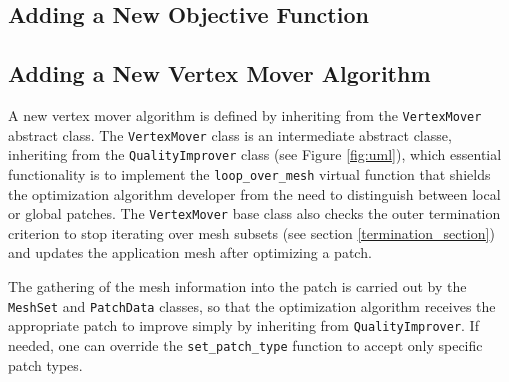 \subsection{Adding a New Objective Function}

\subsection{Adding a New Vertex Mover Algorithm}

A new vertex mover algorithm is defined by inheriting from the
\texttt{VertexMover} abstract class. The \texttt{VertexMover} class 
is an intermediate abstract classe, inheriting from the
\texttt{QualityImprover} class (see Figure \ref{fig:uml}),  which
essential functionality is to implement the \texttt{loop\_over\_mesh}
virtual function that shields the optimization algorithm developer
from the need to distinguish between local or global patches.  The
\texttt{VertexMover} base class also checks the outer termination
criterion to stop iterating over mesh subsets (see section
\ref{termination_section}) and updates the application mesh after
optimizing a patch.

The
gathering of the mesh information into the patch is
carried out by the \texttt{MeshSet} and \texttt{PatchData} classes, so that the
optimization algorithm receives the appropriate patch to improve
simply by inheriting from \texttt{QualityImprover}.  If needed, one can 
override the \texttt{set\_patch\_type} function to accept only specific
patch types.




